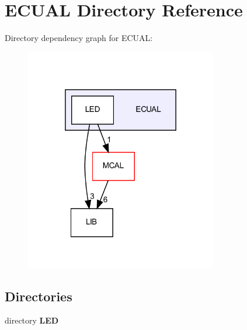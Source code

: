 \section{E\+C\+U\+AL Directory Reference}
\label{dir_7a24211e379eb12231b69ead3b543b84}
Directory dependency graph for E\+C\+U\+AL\+:
\nopagebreak
\begin{figure}[H]
\begin{center}
\leavevmode
\includegraphics[width=238pt]{dir_7a24211e379eb12231b69ead3b543b84_dep}
\end{center}
\end{figure}
\subsection*{Directories}
\begin{DoxyCompactItemize}
\item 
directory \textbf{ L\+ED}
\end{DoxyCompactItemize}
